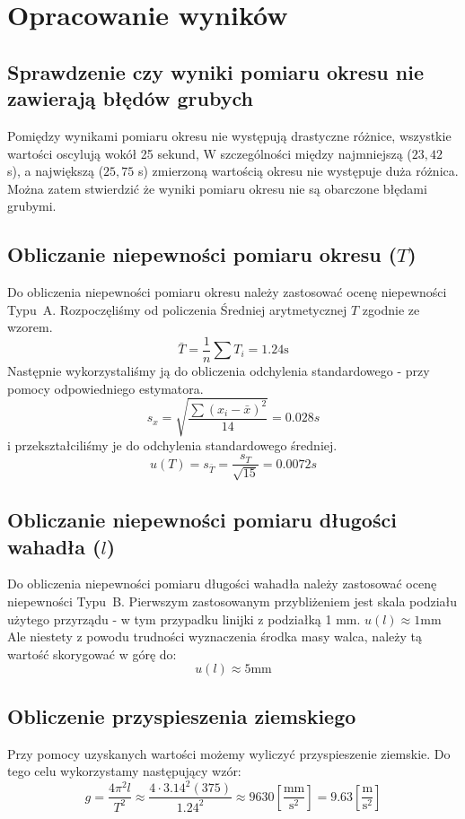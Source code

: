 \documentclass{fizraport}
\begin{document}
\pagebreak
\section{Opracowanie wyników}
\subsection{Sprawdzenie czy wyniki pomiaru okresu nie zawierają błędów grubych}
Pomiędzy wynikami pomiaru okresu nie występują drastyczne różnice, wszystkie wartości oscylują wokół 25 sekund, W szczególności między najmniejszą ($23,42$ s), a największą ($25,75$ s) zmierzoną wartością okresu nie występuje duża różnica. Można zatem stwierdzić że wyniki pomiaru okresu nie są obarczone błędami grubymi.

\subsection{Obliczanie niepewności pomiaru okresu ($T$)}
Do obliczenia niepewności pomiaru okresu należy zastosować ocenę niepewności Typu~A.
Rozpoczęliśmy od policzenia Średniej arytmetycznej $T$ zgodnie ze wzorem.
\[ \bar{T} = \frac{1}{n}\sum{T_i} = 1.24\text{s}\]
Następnie wykorzystaliśmy ją do obliczenia odchylenia standardowego - przy pomocy odpowiedniego estymatora.
\[s_x=\sqrt{\frac{\sum{(x_i-\bar{x})^2}}{14}}=0.028s\]
i przekształciliśmy je do odchylenia standardowego średniej.
\[u(T)=s_{\bar{T}}=\frac{s_T}{\sqrt{15}}=0.0072s\]
\subsection{Obliczanie niepewności pomiaru długości wahadła ($l$)}
Do obliczenia niepewności pomiaru długości wahadła należy zastosować ocenę niepewności Typu~B.
Pierwszym zastosowanym przybliżeniem jest skala podziału użytego przyrządu - w tym przypadku linijki z podziałką 1 mm. $u(l) \approx 1\text{mm}$ Ale niestety z powodu trudności wyznaczenia środka masy walca, należy tą wartość skorygować w górę do:
\[ u(l) \approx 5\text{mm}\]
\pagebreak
\subsection{Obliczenie przyspieszenia ziemskiego}
Przy pomocy uzyskanych wartości możemy wyliczyć przyspieszenie ziemskie.
Do tego celu wykorzystamy następujący wzór:
\[ g = \frac{4\pi^2l}{T^2} \approx \frac{{4 \cdot {3.14}^2 (375)}}{{1.24}^2} \approx 9630 \left[\frac{\text{mm}}{\text{s}^2}\right] = 9.63 \left[\frac{\text{m}}{\text{s}^2}\right]\]
\end{document}
